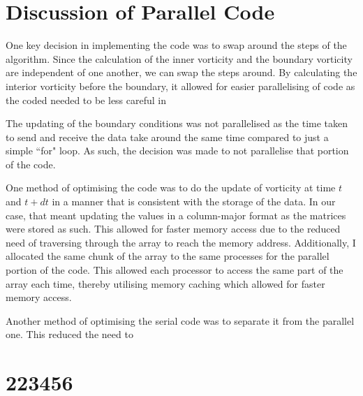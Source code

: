 \documentclass[11pt]{article}
\begin{document}
	\section{Discussion of Parallel Code}
	One key decision in implementing the code was to swap around the steps of the algorithm. Since the calculation of the inner vorticity and the boundary vorticity are independent of one another, we can swap the steps around. By calculating the interior vorticity before the boundary, it allowed for easier parallelising of code as the coded needed to be less careful in
	
	The updating of the boundary conditions was not parallelised as the time taken to send and receive the data take around the same time compared to just a simple ``for" loop. As such, the decision was made to not parallelise that portion of the code.
	
	One method of optimising the code was to do the update of vorticity at time $t$ and $t+dt$ in a manner that is consistent with the storage of the data. In our case, that meant updating the values in a column-major format as the matrices were stored as such. This allowed for faster memory access due to the reduced need of traversing through the array to reach the memory address. Additionally, I allocated the same chunk of the array to the same processes for the parallel portion of the code. This allowed each processor to access the same part of the array each time, thereby utilising memory caching which allowed for faster memory access.
	
	Another method of optimising the serial code was to separate it from the parallel one. This reduced the need to
	
	\section{223456}
\end{document}
